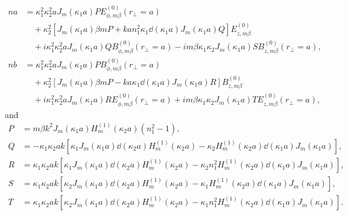 \documentclass[preprint,aps,pra,onecolumn]{revtex4-1} %
\begin{document}
\begin{align}
na &= \kappa_1^2\kappa_2^2aJ_m(\kappa_1a)PE_{\phi,m\beta}^{(0)}(r\!_\perp\!=\!a) \nonumber\\
&\quad + \kappa_2^2\left[J_m(\kappa_1a)\beta mP+kan_1^2\kappa_1 \dd{}{(\kappa_1a)}J_m(\kappa_1a)Q \right] E_{z,m\beta}^{(0)} \nonumber\\
&\quad + i\kappa_1^2\kappa_2^2 aJ_m(\kappa_1a)QB_{\phi,m\beta}^{(0)}(r\!_\perp\!\!=\!a) \!-\! im\beta \kappa_1\kappa_2J_m(\kappa_1a)SB_{z,m\beta}^{(0)}(r\!_\perp\!\!=\!a),\\
nb &= \kappa_1^2\kappa_2^2aJ_m(\kappa_1a)PB_{\phi,m\beta}^{(0)}(r\!_\perp\!=\!a) \nonumber\\
&\quad + \kappa_2^2\left[J_m(\kappa_1a)\beta mP-ka\kappa_1 \dd{}{(\kappa_1a)}J_m(\kappa_1a)R \right] B_{z,m\beta}^{(0)} \nonumber\\
&\quad + i\kappa_1^2\kappa_2^2 aJ_m(\kappa_1a)RE_{\phi,m\beta}^{(0)}(r\!_\perp\!\!=\!a) \!+\! im\beta \kappa_1\kappa_2J_m(\kappa_1a)TE_{z,m\beta}^{(0)}(r\!_\perp\!\!=\!a),
\end{align} 
and
\begin{align}
P &=m\beta k^2J_m(\kappa_1a)H_m^{(1)}(\kappa_2a)(n_1^2-1),\\
Q &=-\kappa_1\kappa_2ak\left[ \kappa_1J_m(\kappa_1a)\dd{}{(\kappa_2a)}H_m^{(1)}(\kappa_2a)-\kappa_2H_m^{(1)}(\kappa_2a)\dd{}{(\kappa_1a)}J_m(\kappa_1a) \right],\\
R &=\kappa_1\kappa_2ak\left[ \kappa_1J_m(\kappa_1a)\dd{}{(\kappa_2a)}H_m^{(1)}(\kappa_2a)-\kappa_2n_1^2H_m^{(1)}(\kappa_2a)\dd{}{(\kappa_1a)}J_m(\kappa_1a) \right],\\
S &=\kappa_1\kappa_2ak\left[ \kappa_2J_m(\kappa_1a)\dd{}{(\kappa_2a)}H_m^{(1)}(\kappa_2a)-\kappa_1H_m^{(1)}(\kappa_2a)\dd{}{(\kappa_1a)}J_m(\kappa_1a) \right],\\
T &=\kappa_1\kappa_2ak\left[ \kappa_2J_m(\kappa_1a)\dd{}{(\kappa_2a)}H_m^{(1)}(\kappa_2a)-\kappa_1n_1^2H_m^{(1)}(\kappa_2a)\dd{}{(\kappa_1a)}J_m(\kappa_1a) \right].
\end{align}
\end{document}
